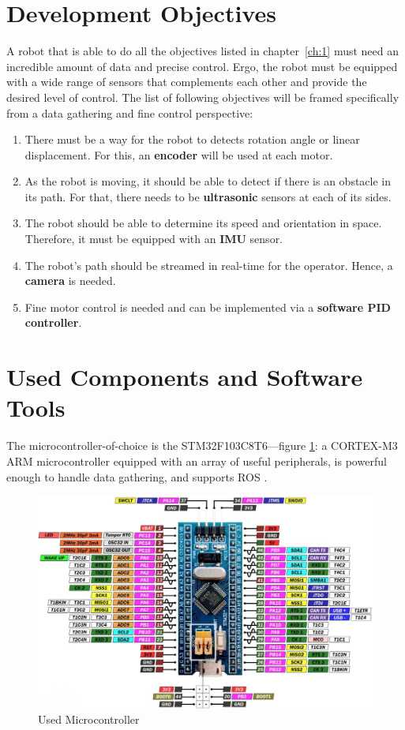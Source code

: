 \section{Development Objectives}
A robot that is able to do all the objectives listed in chapter~\ref{ch:1} must need an incredible amount of data and precise control. Ergo, the robot must be equipped with a wide range of sensors that complements each other and provide the desired level of control. The list of following objectives will be framed specifically from a data gathering and fine control perspective:
\begin{enumerate}
    \item There must be a way for the robot to detects rotation angle or linear displacement. For this, an \textbf{encoder} will be used at each motor.
    \item As the robot is moving, it should be able to detect if there is an obstacle in its path. For that, there needs to be \textbf{ultrasonic} sensors at each of its sides.
    \item The robot should be able to determine its speed and orientation in space. Therefore, it must be equipped with an \textbf{IMU} sensor.
    \item The robot's path should be streamed in real-time for the operator. Hence, a \textbf{camera} is needed.
    \item Fine motor control is needed and can be implemented via a \textbf{software PID controller}.
\end{enumerate}
\newpage

\section{Used Components and Software Tools} %
\vspace{-2mm}
The microcontroller-of-choice is the STM32F103C8T6---figure \ref{fig:stm32}: a CORTEX-M3 ARM microcontroller equipped with an array of useful peripherals, is powerful enough to handle data gathering, and supports ROS \cite{stm32-site}.
\vspace{-1mm}
% 
\begin{figure}[h!]
    \centering
    \includegraphics[scale=0.35]{./Figures/Ch4/stm32.png}
    \caption{Used Microcontroller}
    \label{fig:stm32}
\end{figure}

